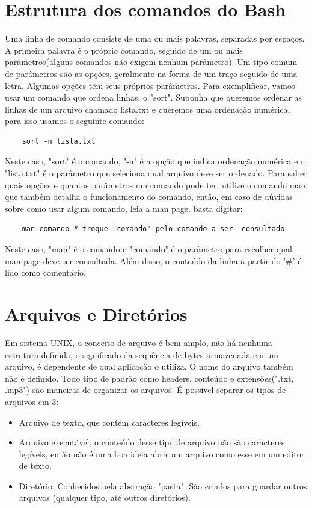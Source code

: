 \documentclass[oneside, 11 pt]{article}
\begin{document}
	\section{Estrutura dos comandos do Bash}
	Uma linha de comando consiste de uma ou mais palavras, separadas por espaços. A primeira palavra é o próprio comando, seguido de um ou mais parâmetros(alguns comandos não exigem nenhum parâmetro). Um tipo comum de parâmetros são as opções, geralmente na forma de um traço seguido de uma letra. Algumas opções têm seus próprios parâmetros. Para exemplificar, vamos usar um comando que ordena linhas, o "sort". Suponha que queremos ordenar as linhas de um arquivo chamado lista.txt e queremos uma ordenação numérica, para isso usamos o seguinte comando:
	\begin{lstlisting}
	sort -n lista.txt
	\end{lstlisting}
	Neste caso, "sort" é o comando, "-n" é a opção que indica ordenação numérica e o "lista.txt" é o parâmetro que seleciona qual arquivo deve ser ordenado.
	Para saber quais opções e quantos parâmetros um comando pode ter, utilize o comando man, que também detalha o funcionamento do comando, então, em caso de dúvidas sobre como usar algum comando, leia a man page. basta digitar:
	\begin{lstlisting}
	man comando # troque "comando" pelo comando a ser  consultado
	\end{lstlisting}
	Neste caso, "man" é o comando e "comando" é o parâmetro para escolher qual man page deve ser consultada. Além disso, o conteúdo da linha à partir do '\#' é lido como comentário.
	
	\section{Arquivos e Diretórios}
	Em sistema UNIX, o conceito de arquivo é bem amplo, não há nenhuma estrutura definida, o significado da sequência de bytes armazenada em um arquivo, é dependente de qual aplicação o utiliza. O nome do arquivo também não é definido. Todo tipo de padrão como headers, conteúdo e extensões(".txt, .mp3") são maneiras de organizar os arquivos. É possível separar os tipos de arquivos em 3:
	\begin{itemize}
		\item Arquivo de texto, que contém caracteres legíveis.
		\item Arquivo executável, o conteúdo desse tipo de arquivo não são caracteres legíveis, então não é uma boa ideia abrir um arquivo como esse em um editor de texto.
		\item Diretório. Conhecidos pela abstração "pasta". São criados para guardar outros arquivos (qualquer tipo, até outros diretórios).
	\end{itemize}
\end{document}
